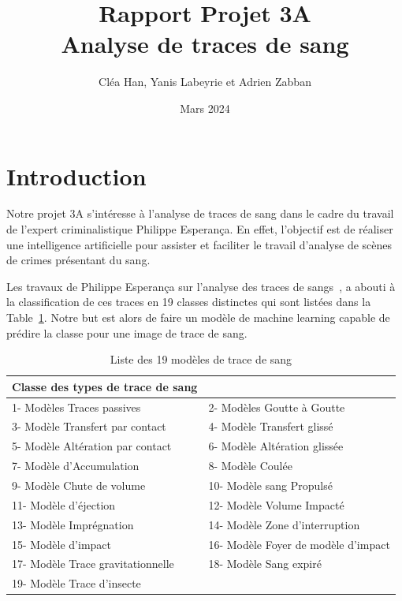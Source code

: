 \documentclass[a4paper]{article}
\title{Rapport Projet 3A \\ Analyse de traces de sang}
\author{Cléa Han, Yanis Labeyrie et Adrien Zabban}
\date{Mars 2024}
\begin{document}
\maketitle

\section{Introduction}

Notre projet 3A s'intéresse à l'analyse de traces de sang dans le cadre du travail de l'expert criminalistique Philippe Esperança. En effet, l'objectif est de réaliser une intelligence artificielle pour assister et faciliter le travail d'analyse de scènes de crimes présentant du sang. 

Les travaux de Philippe Esperança sur l'analyse des traces de sangs~\cite{PhilippeEsperança}, a abouti à la classification de ces traces en 19 classes distinctes qui sont listées dans la Table~\ref{tab:classes}. Notre but est alors de faire un modèle de machine learning capable de prédire la classe pour une image de trace de sang.

\begin{table}[ht]
    \centering
    \begin{tabular}{|ll|}
        \hline
        \textbf{Classe des types de trace de sang} &  \\
        \hline
        1- Modèles Traces passives & 2- Modèles Goutte à Goutte \\
        3- Modèle Transfert par contact & 4- Modèle Transfert glissé \\
        5- Modèle Altération par contact & 6- Modèle Altération glissée \\
        7- Modèle d'Accumulation & 8- Modèle Coulée \\
        9- Modèle Chute de volume & 10- Modèle sang Propulsé \\
        11- Modèle d'éjection & 12- Modèle Volume Impacté \\
        13- Modèle Imprégnation & 14- Modèle Zone d'interruption \\
        15- Modèle d'impact & 16- Modèle Foyer de modèle d'impact \\
        17- Modèle Trace gravitationnelle & 18- Modèle Sang expiré \\
        19- Modèle Trace d'insecte & \\
        \hline
    \end{tabular}
    \caption{Liste des 19 modèles de trace de sang}
    \label{tab:classes}
\end{table}
\end{document}
